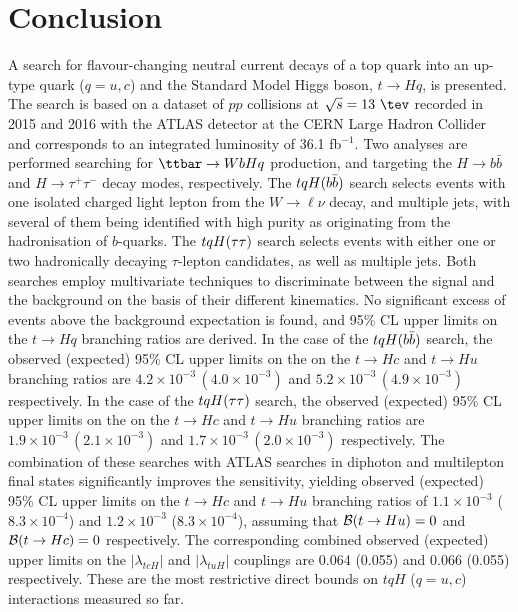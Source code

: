 \section{Conclusion}
\label{sec:conclusion}

A search for flavour-changing neutral current decays of a top quark into an up-type quark ($q=u, c$) and the Standard Model Higgs boson, $t\to Hq$, is presented. 
The search is based on a dataset of $pp$ collisions at $\sqrt{s}=13~\tev$ recorded in 2015 and 2016 with the ATLAS detector at the 
CERN Large Hadron Collider and corresponds to an integrated luminosity of 36.1 fb$^{-1}$.
Two analyses are performed searching for $\ttbar \to WbHq$ production, and targeting the $H \to b\bar{b}$ and $H \to \tau^+\tau^-$ decay modes, respectively.  
The $tqH(b\bar{b})$ search selects events with one isolated charged light lepton from the $W \to \ell\nu$ decay, and multiple jets, with several 
of them being identified with high purity as originating from the hadronisation of $b$-quarks. 
The $tqH(\tau\tau)$ search selects events with either one or two hadronically decaying $\tau$-lepton candidates, as well as multiple jets. 
Both searches employ multivariate techniques to discriminate between the signal and the background on the basis of their different kinematics. 
No significant excess of events above the background expectation is found, and 95\% CL upper limits on the $t\to Hq$ branching ratios are derived.
In the case of the $tqH(b\bar{b})$ search, the observed (expected) 95\% CL upper limits on the on the $t\to Hc$ and $t\to Hu$ branching ratios 
are $4.2 \times 10^{-3}\,(4.0 \times 10^{-3})$ and $5.2 \times 10^{-3}\,(4.9 \times 10^{-3})$ respectively.
In the case of the $tqH(\tau\tau)$ search, the observed (expected) 95\% CL upper limits on the on the $t\to Hc$ and $t\to Hu$ branching ratios 
are $1.9 \times 10^{-3}\,(2.1 \times 10^{-3})$ and $1.7 \times 10^{-3}\,(2.0 \times 10^{-3})$ respectively.
The combination of these searches with ATLAS searches in diphoton and multilepton final states significantly improves the sensitivity, 
yielding observed (expected) 95\% CL upper limits on the $t\to Hc$ and $t\to Hu$ branching ratios of $1.1 \times 10^{-3}$ ($8.3 \times 10^{-4}$) 
and $1.2 \times 10^{-3}$ ($8.3 \times 10^{-4}$), assuming that $\mathcal{B}(t\to Hu)=0$ and $\mathcal{B}(t\to Hc)=0$ respectively.
The corresponding combined observed (expected) upper limits on the $|\lambda_{tcH}|$ and $|\lambda_{tuH}|$ couplings are 0.064 (0.055) and 0.066 (0.055) respectively. 
These are the most restrictive direct bounds on $tqH$ ($q=u,c$) interactions measured so far.
